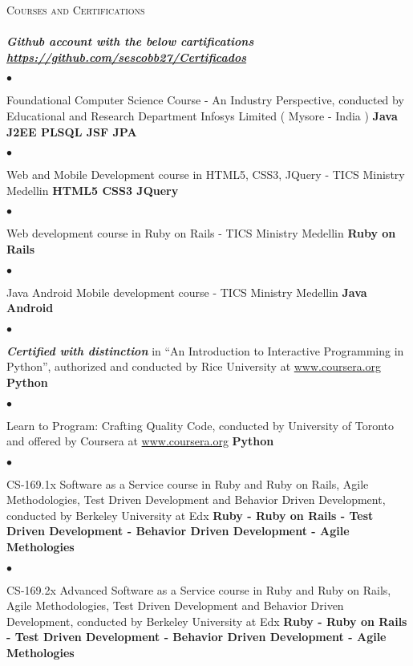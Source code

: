 \documentclass[a4paper]{article}
\newcommand{\lineunder}{\vspace*{-8pt} \\ \hspace*{-18pt} \hrulefill \\}
\newcommand{\header}[1]{{\hspace*{-15pt}\vspace*{6pt}
\textsc{#1}} \vspace*{-6pt} \lineunder}
\newenvironment{achievements}{\begin{list}{$\bullet$}{\topsep 0pt \itemsep
-2pt}}{\vspace*{4pt}\end{list}}
\newcommand{\programming}[1]{{\textbf{#1}}}
\newcommand{\emphasys}[1]{\textbf{\emph{#1}}}
\begin{document}
\header{Courses and Certifications}
\emphasys{Github account with the below cartifications \url{https://github.com/sescobb27/Certificados}}
\begin{achievements}
\item Foundational Computer Science Course - An Industry Perspective, conducted by Educational and Research Department Infosys Limited ( Mysore - India )
\programming{Java J2EE PLSQL JSF JPA}
\end{achievements}
\begin{achievements}
\item Web and Mobile Development course in HTML5, CSS3, JQuery - TICS Ministry Medellin
\programming{ HTML5 CSS3 JQuery }
\end{achievements}
\begin{achievements}
\item{Web development course in Ruby on Rails - TICS Ministry Medellin}
\programming{Ruby on Rails}
\end{achievements}
\begin{achievements}
\item{Java Android Mobile development course - TICS Ministry Medellin}
\programming{Java Android}
\end{achievements}
\begin{achievements}
\item{\emphasys{Certified with distinction} in “An Introduction to Interactive Programming in Python”, authorized and conducted by Rice University at \url{www.coursera.org}}
\programming{Python}
\end{achievements}
\begin{achievements}
\item{Learn to Program: Crafting Quality Code, conducted by University of Toronto and offered by Coursera at \url{www.coursera.org}}
\programming{Python}
\end{achievements}
\begin{achievements}
\item{CS-169.1x Software as a Service course in Ruby and Ruby on Rails, Agile Methodologies, Test Driven Development and Behavior Driven Development, conducted by Berkeley University at Edx}
\programming{Ruby - Ruby on Rails - Test Driven Development - Behavior Driven Development - Agile Methologies}
\end{achievements}
\begin{achievements}
\item{CS-169.2x Advanced Software as a Service course in Ruby and Ruby on Rails, Agile Methodologies, Test Driven Development and Behavior Driven Development, conducted by Berkeley University at Edx}
\programming{Ruby - Ruby on Rails - Test Driven Development - Behavior Driven Development - Agile Methologies}
\end{achievements}
\end{document}

